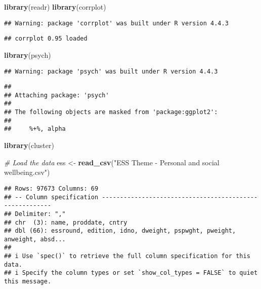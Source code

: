 \documentclass[
]{article}
\newenvironment{Shaded}{\begin{snugshade}}{\end{snugshade}}
\newcommand{\CommentTok}[1]{\textcolor[rgb]{0.56,0.35,0.01}{\textit{#1}}}
\newcommand{\FunctionTok}[1]{\textcolor[rgb]{0.13,0.29,0.53}{\textbf{#1}}}
\newcommand{\NormalTok}[1]{#1}
\newcommand{\OtherTok}[1]{\textcolor[rgb]{0.56,0.35,0.01}{#1}}
\newcommand{\StringTok}[1]{\textcolor[rgb]{0.31,0.60,0.02}{#1}}
\begin{document}
\begin{Shaded}
\begin{Highlighting}[]
\FunctionTok{library}\NormalTok{(readr)}
\FunctionTok{library}\NormalTok{(corrplot)}
\end{Highlighting}
\end{Shaded}

\begin{verbatim}
## Warning: package 'corrplot' was built under R version 4.4.3
\end{verbatim}

\begin{verbatim}
## corrplot 0.95 loaded
\end{verbatim}

\begin{Shaded}
\begin{Highlighting}[]
\FunctionTok{library}\NormalTok{(psych)}
\end{Highlighting}
\end{Shaded}

\begin{verbatim}
## Warning: package 'psych' was built under R version 4.4.3
\end{verbatim}

\begin{verbatim}
## 
## Attaching package: 'psych'
## 
## The following objects are masked from 'package:ggplot2':
## 
##     %+%, alpha
\end{verbatim}

\begin{Shaded}
\begin{Highlighting}[]
\FunctionTok{library}\NormalTok{(cluster)}
\end{Highlighting}
\end{Shaded}

\begin{Shaded}
\begin{Highlighting}[]
\CommentTok{\# Load the data}
\NormalTok{ess }\OtherTok{\textless{}{-}} \FunctionTok{read\_csv}\NormalTok{(}\StringTok{"ESS Theme {-} Personal and social wellbeing.csv"}\NormalTok{)}
\end{Highlighting}
\end{Shaded}

\begin{verbatim}
## Rows: 97673 Columns: 69
## -- Column specification --------------------------------------------------------
## Delimiter: ","
## chr  (3): name, proddate, cntry
## dbl (66): essround, edition, idno, dweight, pspwght, pweight, anweight, absd...
## 
## i Use `spec()` to retrieve the full column specification for this data.
## i Specify the column types or set `show_col_types = FALSE` to quiet this message.
\end{verbatim}
\end{document}
